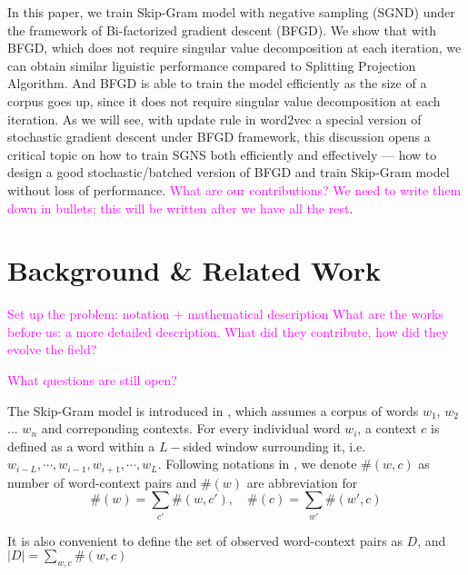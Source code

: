 \documentclass[letterpaper]{article} %
\begin{document}
In this paper, we train Skip-Gram model with negative sampling (SGND) under the framework of Bi-factorized gradient descent (BFGD). We show that with BFGD, which does not require singular value decomposition at each iteration, we can obtain similar liguistic performance compared to Splitting Projection Algorithm. And BFGD is able to train the model efficiently as the size of a corpus goes up, since it does not require singular value decomposition at each iteration.
As we will see, with update rule in word2vec a special version of stochastic gradient descent under BFGD framework, this discussion opens a critical topic on how to train SGNS both efficiently and effectively --- how to design a good stochastic/batched version of BFGD and train Skip-Gram model without loss of performance.
\textcolor{magenta}{What are our contributions? We need to write them down in bullets; this will be written after we have all the rest}.

\section{Background \& Related Work}
\textcolor{magenta}{Set up the problem: notation + mathematical description}
\textcolor{magenta}{What are the works before us: a more detailed description. What did they contribute, how did they evolve the field?}

\textcolor{magenta}{What questions are still open?}



The Skip-Gram model is introduced in \cite{NIPS2013_5021}, which assumes a corpus of words $w_1$, $w_2$ ... $w_n$ and correponding contexts. For every individual word $w_i$, a context $c$ is defined as a word within a $L-$sided window surrounding it, i.e. $w_{i−L},\cdots, w_{i−1},w_{i+1},\cdots,w_L$. Following notations in \cite{levy2014neural}, we denote $\#(w,c)$ as number of word-context pairs and $\#(w)$ are abbreviation for
\begin{equation}
\#(w)=\sum_{c'}\#(w,c'),\quad\#(c)=\sum_{w'}\#(w',c)	
\end{equation}

It is also convenient to define the set of observed word-context pairs as $D$, and $|D|=\sum_{w,c}\#(w,c)$
\end{document}

